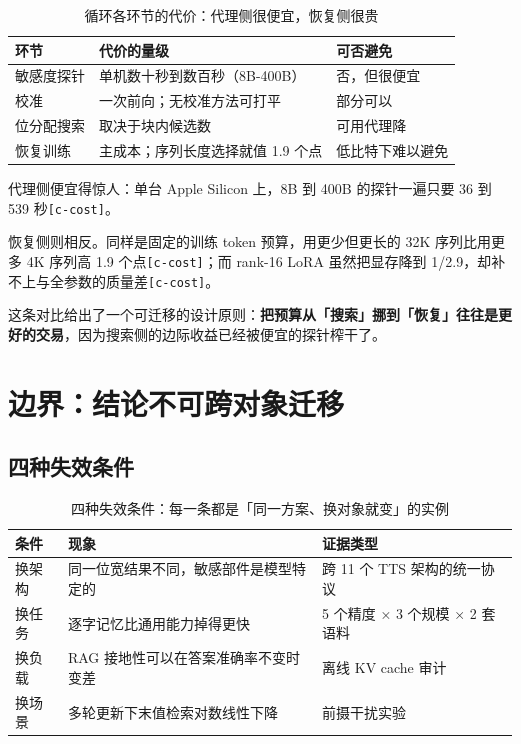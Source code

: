 \begin{table}[t]
\centering
\footnotesize
\setlength{\tabcolsep}{4pt}
\caption{循环各环节的代价：代理侧很便宜，恢复侧很贵}
\label{tab:4}
\begin{tabular}{lll}
\toprule
环节 & 代价的量级 & 可否避免 \\
\midrule
敏感度探针 & 单机数十秒到数百秒（8B-\hspace{0pt}400B） & 否，但很便宜 \\
校准 & 一次前向；无校准方法可打平 & 部分可以 \\
位分配搜索 & 取决于块内候选数 & 可用代理降 \\
恢复训练 & 主成本；序列长度选择就值 1.9 个点 & 低比特下难以避免 \\
\bottomrule
\end{tabular}
\end{table}

代理侧便宜得惊人：单台 Apple Silicon 上，8B 到 400B 的探针一遍只要 36 到 539 秒{\scriptsize\texttt{[c-\hspace{0pt}cost]}}。


恢复侧则相反。同样是固定的训练 token 预算，用更少但更长的 32K 序列比用更多 4K 序列高 1.9 个点{\scriptsize\texttt{[c-\hspace{0pt}cost]}}；而 rank-16 LoRA 虽然把显存降到 1/2.9，却补不上与全参数的质量差{\scriptsize\texttt{[c-\hspace{0pt}cost]}}。


这条对比给出了一个可迁移的设计原则：\textbf{把预算从「搜索」挪到「恢复」往往是更好的交易}，因为搜索侧的边际收益已经被便宜的探针榨干了。


\section{边界：结论不可跨对象迁移}

\subsection{四种失效条件}

\begin{table}[t]
\centering
\footnotesize
\setlength{\tabcolsep}{4pt}
\caption{四种失效条件：每一条都是「同一方案、换对象就变」的实例}
\label{tab:5}
\begin{tabular}{lll}
\toprule
条件 & 现象 & 证据类型 \\
\midrule
换架构 & 同一位宽结果不同，敏感部件是模型特定的 & 跨 11 个 TTS 架构的统一协议 \\
换任务 & 逐字记忆比通用能力掉得更快 & 5 个精度 × 3 个规模 × 2 套语料 \\
换负载 & RAG 接地性可以在答案准确率不变时变差 & 离线 KV cache 审计 \\
换场景 & 多轮更新下末值检索对数线性下降 & 前摄干扰实验 \\
\bottomrule
\end{tabular}
\end{table}

